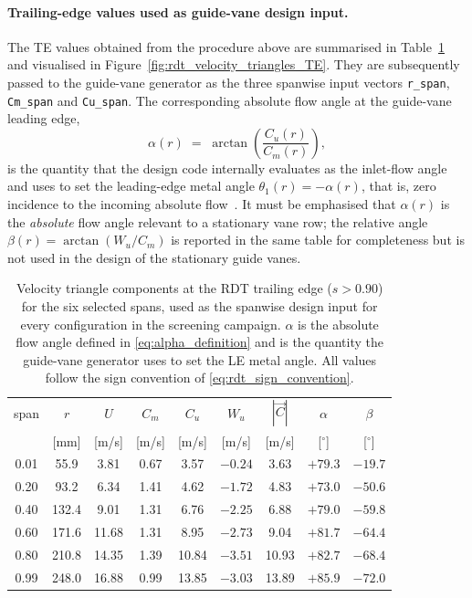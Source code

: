 \paragraph{Trailing-edge values used as guide-vane design input.}
The TE values obtained from the procedure above are summarised in Table~\ref{tab:rdt_te_values} and visualised in Figure~\ref{fig:rdt_velocity_triangles_TE}. They are subsequently passed to the guide-vane generator as the three spanwise input vectors \texttt{r\_span}, \texttt{Cm\_span} and \texttt{Cu\_span}. The corresponding absolute flow angle at the guide-vane leading edge,
\begin{equation}
\alpha(r) \;=\; \arctan\!\left(\frac{C_u(r)}{C_m(r)}\right),
\label{eq:alpha_definition}
\end{equation}
is the quantity that the design code internally evaluates as the inlet-flow angle and uses to set the leading-edge metal angle $\theta_1(r)=-\alpha(r)$, that is, zero incidence to the incoming absolute flow~\cite{Leonsen2025}. It must be emphasised that $\alpha(r)$ is the \emph{absolute} flow angle relevant to a stationary vane row; the relative angle $\beta(r)=\arctan(W_u/C_m)$ is reported in the same table for completeness but is not used in the design of the stationary guide vanes.
 
\begin{table}[H]
  \centering
  \caption[RDT trailing-edge velocity triangle at six spans]{Velocity triangle components at the RDT trailing edge ($s>0.90$) for the six selected spans, used as the spanwise design input for every configuration in the screening campaign. $\alpha$ is the absolute flow angle defined in \eqref{eq:alpha_definition} and is the quantity the guide-vane generator uses to set the LE metal angle. All values follow the sign convention of \eqref{eq:rdt_sign_convention}.}
  \label{tab:rdt_te_values}
  \begin{tabular}{ccccccccc}
    \hline
    span & $r$ & $U$ & $C_m$ & $C_u$ & $W_u$ & $|\vec{C}|$ & $\alpha$ & $\beta$ \\
         & [mm] & [m/s] & [m/s] & [m/s] & [m/s] & [m/s] & [$^\circ$] & [$^\circ$] \\
    \hline
    0.01 &  55.9 &  3.81 & 0.67 &  3.57 & $-0.24$ &  3.63 & $+79.3$ & $-19.7$ \\
    0.20 &  93.2 &  6.34 & 1.41 &  4.62 & $-1.72$ &  4.83 & $+73.0$ & $-50.6$ \\
    0.40 & 132.4 &  9.01 & 1.31 &  6.76 & $-2.25$ &  6.88 & $+79.0$ & $-59.8$ \\
    0.60 & 171.6 & 11.68 & 1.31 &  8.95 & $-2.73$ &  9.04 & $+81.7$ & $-64.4$ \\
    0.80 & 210.8 & 14.35 & 1.39 & 10.84 & $-3.51$ & 10.93 & $+82.7$ & $-68.4$ \\
    0.99 & 248.0 & 16.88 & 0.99 & 13.85 & $-3.03$ & 13.89 & $+85.9$ & $-72.0$ \\
    \hline
  \end{tabular}
\end{table}
 
